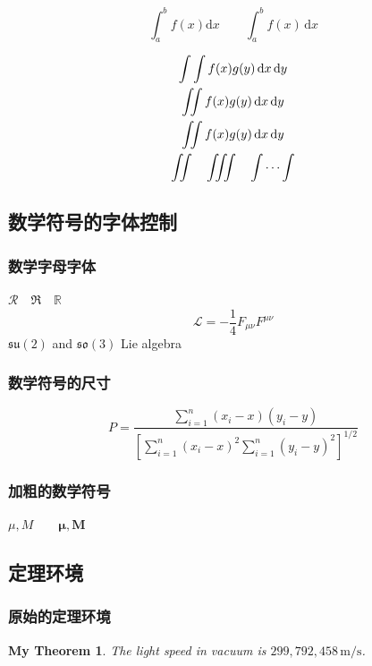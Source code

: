 \documentclass[12pt,UTF8]{ctexart}%
\begin{document}
\[
\int_a^b f(x)\mathrm{d}x
\qquad
\int_a^b f(x)\,\mathrm{d}x
\]

\newcommand\diff{\,\mathrm{d}}
\begin{gather*}
\int\int f(x)g(y)
\diff x \diff y \\
\int\!\!\!\int
f(x)g(y) \diff x \diff y \\
\iint f(x)g(y) \diff x \diff y \\
\iint\quad \iiint\quad \idotsint
\end{gather*}


\subsection{数学符号的字体控制}

\subsubsection{数学字母字体}

$\mathcal{R} \quad \mathfrak{R}
\quad \mathbb{R}$
\[\mathcal{L}
= -\frac{1}{4}F_{\mu\nu}F^{\mu\nu}\]
$\mathfrak{su}(2)$ and
$\mathfrak{so}(3)$ Lie algebra

\subsubsection{数学符号的尺寸}

\[
P = \frac
{\sum_{i=1}^n (x_i- x)(y_i- y)}
{\displaystyle \left[
\sum_{i=1}^n (x_i-x)^2
\sum_{i=1}^n (y_i-y)^2
\right]^{1/2} }
\]


\subsubsection{加粗的数学符号}

$\mu, M \qquad
\mathbf{\mu}, \mathbf{M}$


\subsection{定理环境}

\subsubsection{原始的定理环境}

\newtheorem{mythm}{My Theorem}[section]
\begin{mythm}\label{thm:light}
The light speed in vacuum
is $299,792,458\,\mathrm{m/s}$.
\end{mythm}
\end{document}
